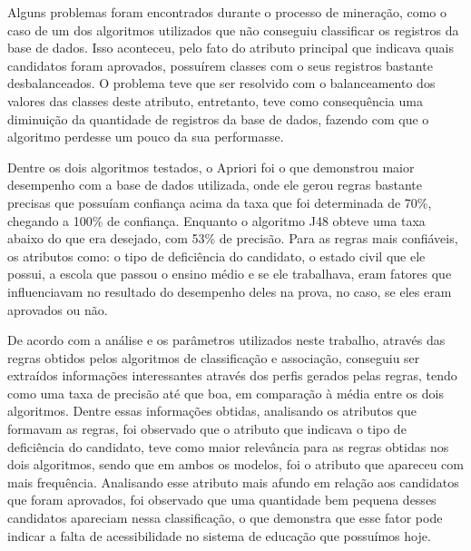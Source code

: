 \par
Alguns problemas foram encontrados durante o processo de mineração, como o caso de um dos algoritmos utilizados que não conseguiu classificar os registros da base de dados.  Isso aconteceu, pelo fato do atributo principal que indicava quais candidatos foram aprovados, possuírem classes com o seus registros bastante desbalanceados. O problema teve que ser resolvido com o balanceamento dos valores das classes deste atributo, entretanto, teve como consequência uma diminuição da quantidade de registros da base de dados, fazendo com que o algoritmo perdesse um pouco da sua performasse.

\par
Dentre os dois algoritmos testados, o Apriori foi o que demonstrou maior desempenho com a base de dados utilizada, onde ele gerou regras bastante precisas que possuíam confiança acima da taxa que foi determinada de 70\%, chegando a 100\% de confiança. Enquanto o algoritmo J48 obteve uma taxa abaixo do que era desejado, com 53\% de precisão. Para as regras mais confiáveis, os atributos como: o tipo de deficiência do candidato, o estado civil que ele possui, a escola que passou o ensino médio e se ele trabalhava, eram fatores que influenciavam no resultado do desempenho deles na prova, no caso, se eles eram aprovados ou não.  

\par
De acordo com a análise e os parâmetros utilizados neste trabalho, através das regras obtidos pelos algoritmos de classificação e associação, conseguiu ser extraídos informações interessantes através dos perfis gerados pelas regras, tendo como uma taxa de precisão até que boa, em comparação à média entre os dois algoritmos. Dentre essas informações obtidas, analisando os atributos que formavam as regras, foi observado que o atributo que indicava o tipo de deficiência do candidato, teve como maior relevância para as regras obtidas nos dois algoritmos, sendo que em ambos os modelos, foi o atributo que apareceu com mais frequência. Analisando esse atributo mais afundo em relação aos candidatos que foram aprovados, foi observado que uma quantidade bem pequena desses candidatos apareciam nessa classificação, o que demonstra que esse fator pode indicar a falta de acessibilidade no sistema de educação que possuímos hoje.



